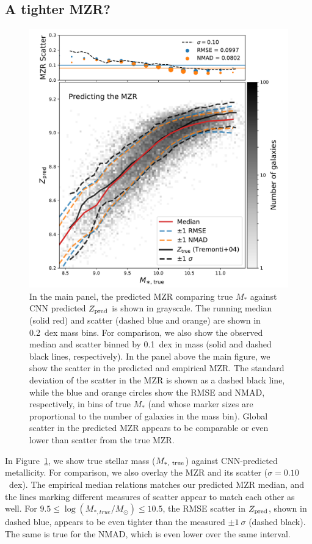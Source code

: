 \documentclass[fleqn,usenatbib]{mnras}
\begin{document}
\subsection{A tighter MZR?}
\begin{figure}
	\includegraphics[width=\columnwidth]{05-mzr.pdf}
	\caption{\label{fig:mzr}
		In the main panel, the predicted MZR comparing true $M_\ast$ against CNN predicted $Z_{\rm pred}$ is shown in grayscale.
		The running median (solid red) and scatter (dashed blue and orange) are shown in 0.2~dex mass bins.
		For comparison, we also show the \citet{2004ApJ...613..898T} observed median and scatter binned by 0.1~dex in mass (solid and dashed black lines, respectively).
		In the panel above the main figure, we show the scatter in the predicted and empirical MZR.
		The standard deviation of the scatter in the MZR is shown as a dashed black line, while the blue and orange circles show the RMSE and NMAD, respectively, in bins of true $M_{\ast}$ (and whose marker sizes are proportional to the number of galaxies in the mass bin).
		Global scatter in the predicted MZR appears to be comparable or even lower than scatter from the true MZR.
	}
\end{figure}

In Figure~\ref{fig:mzr}, we show true stellar mass ($M_{\ast, \rm~true}$) against CNN-predicted metallicity.
For comparison, we also overlay the \cite{2004ApJ...613..898T} MZR and its scatter ($\sigma = 0.10$~dex).
The empirical median relations matches our predicted MZR median, and the lines marking different measures of scatter appear to match each other as well.
For $9.5 \leq \log (M_{\ast, true}/M_\odot) \leq 10.5$, the RMSE scatter in $Z_{\rm pred}$, shown in dashed blue, appears to be even tighter than the measured $\pm 1~\sigma$ (dashed black).
The same is true for the NMAD, which is even lower over the same interval.
\end{document}
